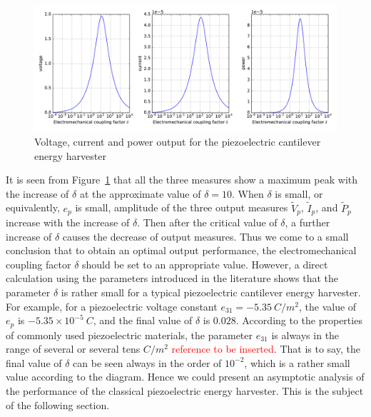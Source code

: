 \documentclass{article}
\begin{document}
\begin{figure}[!htbp]
    \centering
    \includegraphics[width=\textwidth]{./img_eig_asy/fig_sol_analytic_perf_fun}
    \caption{Voltage, current and power output for the piezoelectric cantilever energy harvester}
    \label{fig:fig_sol_analytic_perf_fun}
\end{figure}


It is seen from Figure~\ref{fig:fig_sol_analytic_perf_fun} that all the three measures show a maximum peak with the increase of $\delta$ at the approximate value of $\delta = 10$. When $\delta$ is small, or equivalently, $e_p$ is small, amplitude of the three output measures $\tilde{V}_p$, $\tilde{I}_p$, and $\tilde{P}_p$ increase with the increase of $\delta$. Then after the critical value of $\delta$, a further increase of $\delta$ causes the decrease of output measures. Thus we come to a small conclusion that to obtain an optimal output performance, the electromechanical coupling factor $\delta$ should be set to an appropriate value. However, a direct calculation using the parameters introduced in the literature \cite{erturk2008distributed,erturk2009experimentally} shows that the parameter $\delta$ is rather small for a typical piezoelectric cantilever energy harvester. For example, for a piezoelectric voltage constant $e_{31} = -5.35\ C / m^2$, the value of $e_p$ is $-5.35 \times 10^{-5}\ C$, and the final value of $\delta$ is $0.028$. According to the properties of commonly used piezoelectric materials, the parameter $e_{31}$ is always in the range of several or several tens $C / m^2$ \textcolor{red}{reference to be inserted}. That is to say, the final value of $\delta$ can be seen always in the order of $10^{-2}$, which is a rather small value according to the diagram. Hence we could present an asymptotic analysis of the performance of the classical piezoelectric energy harvester. This is the subject of the following section.
\end{document}
